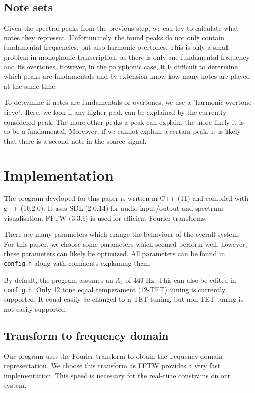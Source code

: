 \documentclass[10pt,twocolumn]{article}
\begin{document}
\subsection{Note sets}
Given the spectral peaks from the previous step, we can try to calculate what notes they represent. Unfortunately, the found peaks do not only contain fundamental frequencies, but also harmonic overtones. This is only a small problem in monophonic transcription, as there is only one fundamental frequency and its overtones. However, in the polyphonic case, it is difficult to determine which peaks are fundamentals and by extension know how many notes are played at the same time.

To determine if notes are fundamentals or overtones, we use a "harmonic overtone sieve". Here, we look if any higher peak can be explained by the currently considered peak. The more other peaks a peak can explain, the more likely it is to be a fundamental. Moreover, if we cannot explain a certain peak, it is likely that there is a second note in the source signal.


\section{Implementation}  \label{sec:impl}
The program developed for this paper is written in C++ (11) and compiled with g++ (10.2.0). It uses SDL (2.0.14) for audio input/output and spectrum visualisation. FFTW (3.3.9) is used for efficient Fourier transforms.

There are many parameters which change the behaviour of the overall system. For this paper, we choose some parameters which seemed perform well, however, these parameters can likely be optimized. All parameters can be found in \texttt{config.h} along with comments explaining them.

By default, the program assumes an $A_4$ of 440 Hz. This can also be edited in \texttt{config.h}. Only 12 tone equal temperament (12-TET) tuning is currently supported. It could easily be changed to n-TET tuning, but non TET tuning is not easily supported.

\subsection{Transform to frequency domain}  \label{sub:four}
Our program uses the Fourier transform to obtain the frequency domain representation. We choose this transform as FFTW provides a very fast implementation. This speed is necessary for the real-time constrains on our system.
\end{document}
